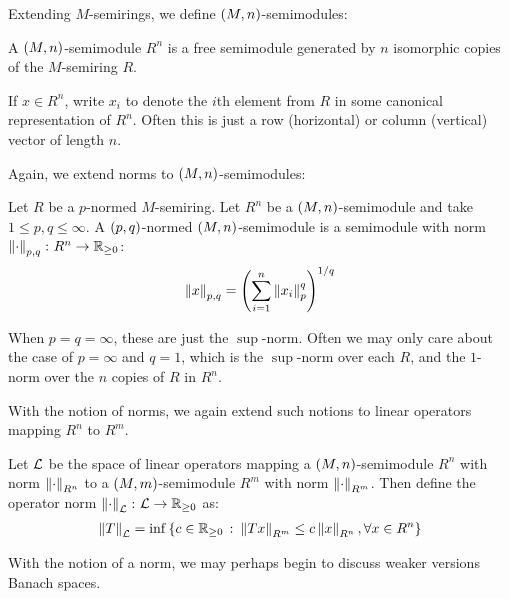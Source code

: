 Extending \(M\)-semirings,
we define \(\left(M, n\right)\)-semimodules:

\begin{definition}
  A \(\left(M, n\right)\)-semimodule \(R ^n\)
  is a free semimodule generated by \(n\) isomorphic copies of
  the \(M\)-semiring \(R\).
\end{definition}

If \(x \in R ^n\), write \(x_i\) to denote the \(i\)th element from
\(R\) in some canonical representation of \(R ^n\).
Often this is just a row (horizontal) or column (vertical)
vector of length \(n\).

Again, we extend norms to \(\left(M, n\right)\)-semimodules:

\begin{definition}
  Let \(R\) be a \(p\)-normed \(M\)-semiring.
  Let \(R ^n\) be a \(\left(M, n\right)\)-semimodule
  and take \(1 \leq p, q \leq \infty\).
  A \(\left(p, q\right)\)-normed \(\left(M, n\right)\)-semimodule
  is a semimodule with norm \(\left\lVert\cdot\right\rVert_{p, q} \colon R^n \to \mathbb{R}_{\geq 0}\):
  \begin{align*}
    \left\lVert x\right\rVert_{p, q}
      = \left(\sum_{i = 1}^{n} \left\lVert x_i\right\rVert_{p}^q\right)^{1 / q}
  \end{align*}
\end{definition}

When \(p = q = \infty\), these are just the \(\sup\)-norm.
Often we may only care about the case of \(p = \infty\) and \(q = 1\),
which is the \(\sup\)-norm over each \(R\),
and the \(1\)-norm over the \(n\) copies of \(R\) in \(R^n\).

With the notion of norms, we again extend such notions to
linear operators mapping \(R^n\) to \(R^m\).

\begin{definition}
  Let \(\mathcal{L}\) be the space of linear operators mapping
  a \(\left(M, n\right)\)-semimodule \(R^n\) with norm \(\left\lVert\cdot\right\rVert_{R^n}\)
  to a \(\left(M, m\right)\)-semimodule \(R^m\) with norm \(\left\lVert\cdot\right\rVert_{R^m}\).
  Then define the operator norm
  \(\left\lVert\cdot\right\rVert_{\mathcal{L}} \colon \mathcal{L} \to \mathbb{R}_{\geq 0}\) as:
  \begin{align*}
    \left\lVert T\right\rVert_{\mathcal{L}} =
      \inf \left\{c \in \mathbb{R}_{\geq 0} \ \colon
              \left\lVert Tx\right\rVert_{R^m}
                \leq c \left\lVert x\right\rVert_{R^n},
              \forall x \in R^n\right\}
  \end{align*}
\end{definition}

With the notion of a norm,
we may perhaps begin to discuss weaker versions Banach spaces.

